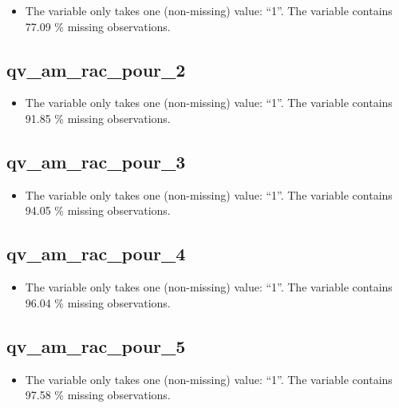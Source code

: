 \documentclass[
  letterpaper,
  DIV=11,
  numbers=noendperiod]{scrartcl}
\providecommand{\tightlist}{%
  \setlength{\itemsep}{0pt}\setlength{\parskip}{0pt}}
\begin{document}
\begin{itemize}
\tightlist
\item
  The variable only takes one (non-missing) value: ``1''. The variable
  contains 77.09 \% missing observations.
\end{itemize}

\fullline

\subsection{qv\_am\_rac\_pour\_2}\label{qv_am_rac_pour_2}

\begin{itemize}
\tightlist
\item
  The variable only takes one (non-missing) value: ``1''. The variable
  contains 91.85 \% missing observations.
\end{itemize}

\fullline

\subsection{qv\_am\_rac\_pour\_3}\label{qv_am_rac_pour_3}

\begin{itemize}
\tightlist
\item
  The variable only takes one (non-missing) value: ``1''. The variable
  contains 94.05 \% missing observations.
\end{itemize}

\fullline

\subsection{qv\_am\_rac\_pour\_4}\label{qv_am_rac_pour_4}

\begin{itemize}
\tightlist
\item
  The variable only takes one (non-missing) value: ``1''. The variable
  contains 96.04 \% missing observations.
\end{itemize}

\fullline

\subsection{qv\_am\_rac\_pour\_5}\label{qv_am_rac_pour_5}

\begin{itemize}
\tightlist
\item
  The variable only takes one (non-missing) value: ``1''. The variable
  contains 97.58 \% missing observations.
\end{itemize}
\end{document}
